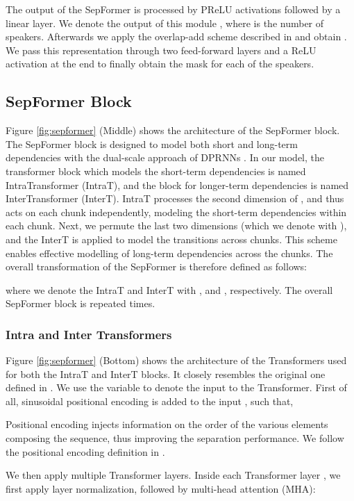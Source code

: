 \documentclass{article}
\begin{document}
The output of the SepFormer  is processed by PReLU activations followed by a linear layer.  
We denote the output of this module , where  is the number of speakers. Afterwards we apply the overlap-add scheme described in \cite{luo2020dualpath} and obtain . We pass this representation through two feed-forward layers and a ReLU activation at the end to finally obtain the mask  for each of the speakers.
\vspace{-0.3cm}
\subsection{SepFormer Block}
\label{sec:sepformer}
Figure \ref{fig:sepformer} (Middle) shows the architecture of the SepFormer block. 
The SepFormer block is designed to model both short and long-term dependencies with the dual-scale approach of DPRNNs \cite{luo2020dualpath}. In our model, the transformer block which models the short-term dependencies is named IntraTransformer (IntraT), and the block for longer-term dependencies is named InterTransformer (InterT). IntraT processes the second dimension of , and thus acts on each chunk independently, modeling the short-term dependencies within each chunk.
Next, we permute the last two dimensions (which we denote with ), and the InterT is applied to model the transitions across chunks. This scheme enables effective modelling of long-term dependencies across the chunks. The overall transformation of the SepFormer is therefore defined as follows:

where we denote the IntraT and InterT with , and , respectively.
The overall SepFormer block is repeated  times. 

\subsubsection{Intra and Inter Transformers}
Figure \ref{fig:sepformer} (Bottom) shows the  architecture of the Transformers used for both the IntraT and InterT blocks. It closely resembles the original one defined in \cite{vaswani2017}.
We use the variable  to denote the input to the Transformer. 
First of all, sinusoidal positional encoding  is added to the input , such that, 

Positional encoding injects information on the order of the various elements composing the sequence, thus improving the separation performance. We follow the positional encoding definition in \cite{vaswani2017}. 

We then apply multiple Transformer layers. Inside each Transformer layer , we first apply layer normalization, followed by multi-head attention (MHA):
\end{document}
